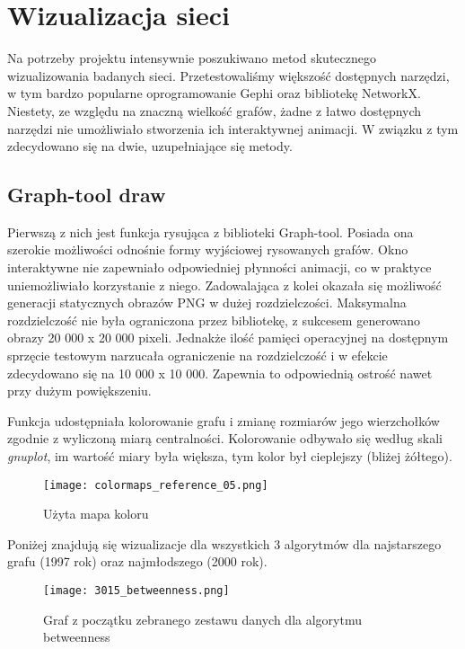 \chapter{Wizualizacja sieci}

Na potrzeby projektu intensywnie poszukiwano metod skutecznego wizualizowania badanych sieci. Przetestowaliśmy większość dostępnych narzędzi, w tym bardzo popularne oprogramowanie Gephi oraz bibliotekę NetworkX. Niestety, ze względu na znaczną wielkość grafów, żadne z łatwo dostępnych narzędzi nie umożliwiało stworzenia ich interaktywnej animacji. W związku z tym zdecydowano się na dwie, uzupełniające się metody.

\section{Graph-tool draw}

Pierwszą z nich jest funkcja rysująca z biblioteki Graph-tool. Posiada ona szerokie możliwości odnośnie formy wyjściowej rysowanych grafów. Okno interaktywne nie zapewniało odpowiedniej płynności animacji, co w praktyce uniemożliwiało korzystanie z niego. Zadowalająca z kolei okazała się możliwość generacji statycznych obrazów PNG w dużej rozdzielczości. Maksymalna rozdzielczość nie była ograniczona przez bibliotekę, z sukcesem generowano obrazy 20 000 x 20 000 pixeli. Jednakże ilość pamięci operacyjnej na dostępnym sprzęcie testowym narzucała ograniczenie na rozdzielczość i w efekcie zdecydowano się na 10 000 x 10 000. Zapewnia to odpowiednią ostrość nawet przy dużym powiększeniu.
 
Funkcja udostępniała kolorowanie grafu i zmianę rozmiarów jego wierzchołków zgodnie z wyliczoną miarą centralności. Kolorowanie odbywało się według skali \textit{gnuplot}, im wartość miary była większa, tym kolor był cieplejszy (bliżej żółtego).

\FloatBarrier\FloatBarrier
\begin{figure}[h]
	\centering
	\texttt{[image: colormaps\_reference\_05.png]}
	\caption{Użyta mapa koloru}
\end{figure}
\FloatBarrier\FloatBarrier

Poniżej znajdują się wizualizacje dla wszystkich 3 algorytmów dla najstarszego grafu (1997 rok) oraz najmłodszego (2000 rok).

\FloatBarrier\FloatBarrier
\begin{figure}[h]
	\centering
	\texttt{[image: 3015\_betweenness.png]}
	\caption{Graf z początku zebranego zestawu danych dla algorytmu betweenness}
\end{figure}
\FloatBarrier\FloatBarrier

